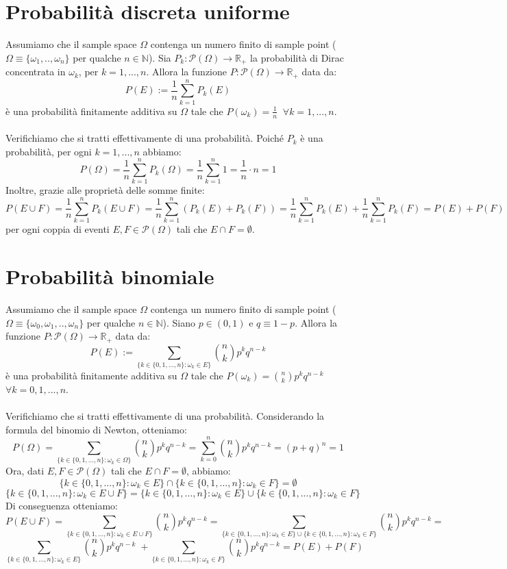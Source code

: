 \documentclass{article}
\begin{document}
\section*{Probabilità discreta uniforme}
Assumiamo che il sample space $\Omega$ contenga un numero finito di sample point ($\Omega \equiv \{\omega_{1},..,\omega_{n}\}$ per qualche $n \in \mathbb{N}$). Sia $P_{k}: \mathcal{P}(\Omega) \to \mathbb{R}_{+}$ la probabilità di Dirac concentrata in $\omega_{k}$, per $k=1,...,n$. Allora la funzione $P: \mathcal{P}(\Omega) \to \mathbb{R}_{+}$ data da:
\[ P(E) := \frac{1}{n} \sum_{k=1}^{n}P_{k}(E) \]
è una probabilità finitamente additiva su $\Omega$ tale che $P(\omega_{k}) = \frac{1}{n} \; \; \forall k=1,...,n$.\\
\\
Verifichiamo che si tratti effettivamente di una probabilità. Poiché $P_{k}$ è una probabilità, per ogni $k=1,...,n$ abbiamo:
\[ P(\Omega) = \frac{1}{n} \sum_{k=1}^{n}P_{k}(\Omega) = \frac{1}{n} \sum_{k=1}^{n}1 = \frac{1}{n} \cdot n = 1 \]
Inoltre, grazie alle proprietà delle somme finite:
\[ P(E \cup F) = \frac{1}{n} \sum_{k=1}^{n}P_{k}(E \cup F) = \frac{1}{n} \sum_{k=1}^{n}(P_{k}(E) + P_{k}(F)) = \frac{1}{n} \sum_{k=1}^{n}P_{k}(E) + \frac{1}{n} \sum_{k=1}^{n}P_{k}(F) = P(E)+P(F) \]
per ogni coppia di eventi $E,F \in \mathcal{P}(\Omega)$ tali che $E \cap F = \emptyset$.

\section*{Probabilità binomiale}
Assumiamo che il sample space $\Omega$ contenga un numero finito di sample point ($\Omega \equiv \{\omega_{0},\omega_{1},..,\omega_{n}\}$ per qualche $n \in \mathbb{N}$). Siano $p \in (0,1)$ e $q \equiv 1-p$. Allora la funzione $P: \mathcal{P}(\Omega) \to \mathbb{R}_{+}$ data da:
\[ P(E) := \sum_{\{k\in \{0,1,...,n\}: \omega_{k}\in E\}}^{}\binom{n}{k}p^{k}q^{n-k} \]
è una probabilità finitamente additiva su $\Omega$ tale che $P(\omega_{k}) = \binom{n}{k}p^{k}q^{n-k}$\\
$\forall k=0,1,...,n$.\\
\\
Verifichiamo che si tratti effettivamente di una probabilità. Considerando la formula del binomio di Newton, otteniamo:
\[ P(\Omega) = \sum_{\{k\in \{0,1,...,n\}: \omega_{k}\in \Omega\}}^{}\binom{n}{k}p^{k}q^{n-k} = \sum_{k=0}^{n}\binom{n}{k}p^{k}q^{n-k} = (p+q)^{n} = 1 \]
Ora, dati $E,F \in \mathcal{P}(\Omega)$ tali che $E \cap F = \emptyset$, abbiamo:
\[ \{k \in \{0,1,...,n\}: \omega_{k} \in E \} \cap \{k \in \{0,1,...,n\}: \omega_{k} \in F \} = \emptyset \]
\[ \{k \in \{0,1,...,n\}: \omega_{k} \in E \cup F \} = \{k \in \{0,1,...,n\}: \omega_{k} \in E \} \cup \{k \in \{0,1,...,n\}: \omega_{k} \in F \} \]
Di conseguenza otteniamo:
\[ P(E \cup F) = \sum_{\{k\in \{0,1,...,n\}: \omega_{k}\in E \cup F\}}^{}\binom{n}{k}p^{k}q^{n-k} = \sum_{\{k\in \{0,1,...,n\}: \omega_{k}\in E\} \cup \{k\in \{0,1,...,n\}: \omega_{k}\in F\}}^{}\binom{n}{k}p^{k}q^{n-k} = \]
\[ \sum_{\{k\in \{0,1,...,n\}: \omega_{k}\in E\}}^{}\binom{n}{k}p^{k}q^{n-k} \; + \sum_{\{k\in \{0,1,...,n\}: \omega_{k}\in F\}}^{}\binom{n}{k}p^{k}q^{n-k} = P(E)+P(F) \]
\end{document}
